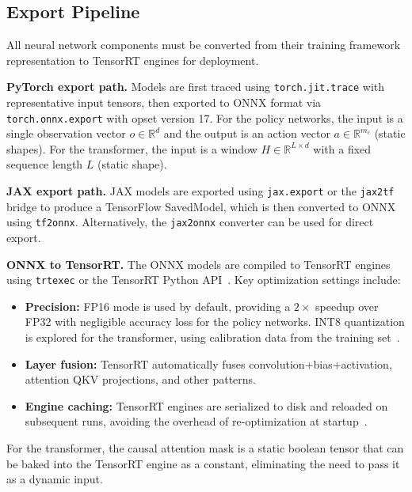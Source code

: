 \documentclass[conference]{IEEEtran}
\newcommand{\R}{\mathbb{R}}
\begin{document}
\subsection{Export Pipeline}\label{sec:export}

All neural network components must be converted from their training
framework representation to TensorRT engines for deployment.

\textbf{PyTorch export path.}  Models are first traced using
\texttt{torch.jit.trace} with representative input tensors, then exported
to ONNX format via \texttt{torch.onnx.export} with opset version 17.
For the policy networks, the input is a single observation vector
$o \in \R^d$ and the output is an action vector $a \in \R^{m_c}$
(static shapes).  For the transformer, the input is a window
$H \in \R^{L \times d}$ with a fixed sequence length $L$ (static shape).

\textbf{JAX export path.}  JAX models are exported using
\texttt{jax.export} or the \texttt{jax2tf} bridge to produce a
TensorFlow SavedModel, which is then converted to ONNX using
\texttt{tf2onnx}.  Alternatively, the \texttt{jax2onnx} converter can be
used for direct export.

\textbf{ONNX to TensorRT.}  The ONNX models are compiled to TensorRT
engines using \texttt{trtexec} or the TensorRT Python
API~\cite{nvidia2024tensorrt}.  Key optimization settings include:
\begin{itemize}
\item \textbf{Precision:} FP16 mode is used by default, providing a
  $2\times$ speedup over FP32 with negligible accuracy loss for the
  policy networks.  INT8 quantization is explored for the transformer,
  using calibration data from the training
  set~\cite{onnxruntime2022transformer}.
\item \textbf{Layer fusion:} TensorRT automatically fuses
  convolution+bias+activation, attention QKV projections, and other
  patterns.
\item \textbf{Engine caching:} TensorRT engines are serialized to disk
  and reloaded on subsequent runs, avoiding the overhead of re-optimization
  at startup~\cite{jeon2022tensorrt}.
\end{itemize}

For the transformer, the causal attention mask is a static boolean tensor
that can be baked into the TensorRT engine as a constant, eliminating
the need to pass it as a dynamic input.
\end{document}
